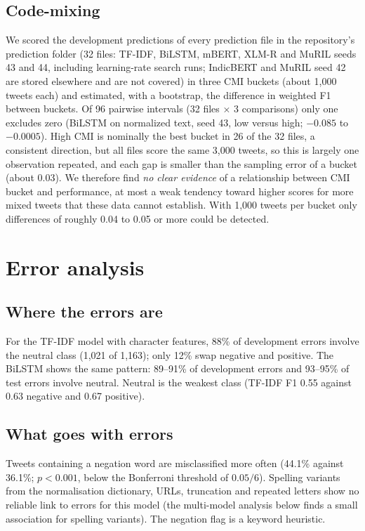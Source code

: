 \documentclass{nle}
\begin{document}
\subsection{Code-mixing}
We scored the development predictions of every prediction file in the repository's prediction folder (32 files: TF-IDF, BiLSTM,
mBERT, XLM-R and MuRIL seeds 43 and 44, including learning-rate search runs; IndicBERT and MuRIL seed 42 are stored elsewhere
and are not covered) in three CMI buckets (about 1{,}000 tweets each) and estimated, with a bootstrap, the difference in weighted
F1 between buckets. Of 96 pairwise intervals (32 files $\times$ 3 comparisons) only one excludes zero (BiLSTM on normalized text,
seed 43, low versus high; $-0.085$ to $-0.0005$). High CMI is nominally the best bucket in 26 of the 32 files, a consistent
direction, but all files score the same 3{,}000 tweets, so this is largely one observation repeated, and each gap is smaller than
the sampling error of a bucket (about 0.03). We therefore find \emph{no clear evidence} of a relationship between CMI bucket and
performance, at most a weak tendency toward higher scores for more mixed tweets that these data cannot establish. With 1{,}000
tweets per bucket only differences of roughly 0.04 to 0.05 or more could be detected.

\section{Error analysis}
\subsection{Where the errors are}
For the TF-IDF model with character features, 88\% of development errors involve the neutral class (1{,}021 of 1{,}163);
only 12\% swap negative and positive. The BiLSTM shows the same pattern: 89--91\% of development errors and 93--95\% of
test errors involve neutral. Neutral is the weakest class (TF-IDF F1 0.55 against 0.63 negative and 0.67 positive).

\subsection{What goes with errors}
Tweets containing a negation word are misclassified more often (44.1\% against 36.1\%; $p<0.001$, below the Bonferroni
threshold of $0.05/6$). Spelling variants from the normalisation dictionary, URLs, truncation and repeated letters show no
reliable link to errors for this model (the multi-model analysis below finds a small association for spelling variants). The
negation flag is a keyword heuristic.
\end{document}
